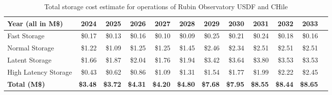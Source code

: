 \tiny \begin{longtable} { |p{}  |r  |r  |r  |r  |r  |r  |r  |r  |r  |r  |r |} 
\caption{Total storage cost estimate for operations of Rubin Observatory USDF and CHile \label{tab:opsStorageCost}}\\ 
\hline 
\textbf{Year (all in M\$)}&\textbf{2024}&\textbf{2025}&\textbf{2026}&\textbf{2027}&\textbf{2028}&\textbf{2029}&\textbf{2030}&\textbf{2031}&\textbf{2032}&\textbf{2033} \\ \hline
{Fast Storage}&{\$0.17}&{\$0.13}&{\$0.16}&{\$0.10}&{\$0.09}&{\$0.25}&{\$0.21}&{\$0.24}&{\$0.18}&{\$0.16} \\ \hline
{Normal Storage}&{\$1.22}&{\$1.09}&{\$1.25}&{\$1.25}&{\$1.45}&{\$2.46}&{\$2.34}&{\$2.51}&{\$2.51}&{\$2.51} \\ \hline
{Latent Storage}&{\$1.66}&{\$1.87}&{\$2.04}&{\$1.76}&{\$1.94}&{\$3.42}&{\$3.64}&{\$3.80}&{\$3.53}&{\$3.53} \\ \hline
{High Latency Storage}&{\$0.43}&{\$0.62}&{\$0.86}&{\$1.09}&{\$1.31}&{\$1.54}&{\$1.77}&{\$1.99}&{\$2.22}&{\$2.45} \\ \hline
\textbf{Total (M\$)}&\textbf{\$3.48}&\textbf{\$3.72}&\textbf{\$4.31}&\textbf{\$4.20}&\textbf{\$4.80}&\textbf{\$7.68}&\textbf{\$7.95}&\textbf{\$8.55}&\textbf{\$8.44}&\textbf{\$8.65} \\ \hline
\end{longtable} \normalsize
